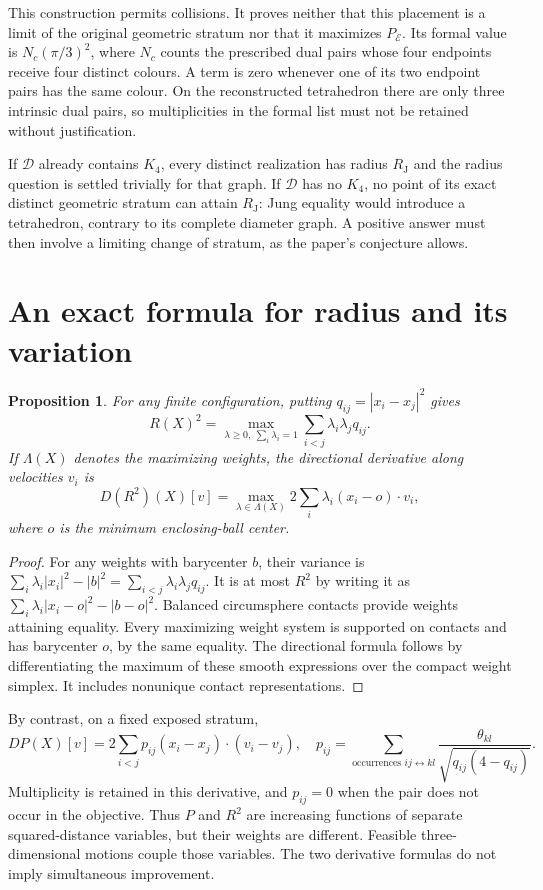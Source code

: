 \documentclass[11pt]{article}
\newtheorem{proposition}[theorem]{Proposition}
\theoremstyle{remark}\newtheorem{remark}[theorem]{Remark}
\newcommand{\RJ}{R_{\mathrm J}}
\begin{document}
This construction permits collisions. It proves neither that this
placement is a limit of the original geometric stratum nor that it
maximizes $P_{\mathcal E}$. Its formal value is
$N_c(\pi/3)^2$, where $N_c$ counts the prescribed dual pairs whose
four endpoints receive four distinct colours. A term is zero whenever
one of its two endpoint pairs has the same colour. On the reconstructed
tetrahedron there are only three intrinsic dual pairs, so multiplicities
in the formal list must not be retained without justification.

If $\mathcal D$ already contains $K_4$, every distinct realization has
radius $\RJ$ and the radius question is settled trivially for that graph.
If $\mathcal D$ has no $K_4$, no point of its exact distinct geometric
stratum can attain $\RJ$: Jung equality would introduce a tetrahedron,
contrary to its complete diameter graph. A positive answer must then
involve a limiting change of stratum, as the paper's conjecture allows.

\section{An exact formula for radius and its variation}
\begin{proposition}\label{fixed:dualradius}
For any finite configuration, putting $q_{ij}=|x_i-x_j|^2$ gives
\[
 \boxed{R(X)^2=\max_{\lambda\geq0,\ \sum_i\lambda_i=1}
                   \sum_{i<j}\lambda_i\lambda_j q_{ij}.}
\]
If $\Lambda(X)$ denotes the maximizing weights, the directional derivative
along velocities $v_i$ is
\[
 D(R^2)(X)[v]=\max_{\lambda\in\Lambda(X)}
 2\sum_i\lambda_i(x_i-o)\cdot v_i,
\]
where $o$ is the minimum enclosing-ball center.
\end{proposition}
\begin{proof}
For any weights with barycenter $b$, their variance is
$\sum_i\lambda_i|x_i|^2-|b|^2
=\sum_{i<j}\lambda_i\lambda_j q_{ij}$.
It is at most $R^2$ by writing it as
$\sum_i\lambda_i|x_i-o|^2-|b-o|^2$.
Balanced circumsphere contacts provide weights attaining equality.
Every maximizing weight system is supported on contacts and has
barycenter $o$, by the same equality. The directional formula follows
by differentiating the maximum of these smooth expressions over the
compact weight simplex. It includes nonunique contact representations.
\end{proof}

By contrast, on a fixed exposed stratum,
\[
 DP(X)[v]=2\sum_{i<j}p_{ij}(x_i-x_j)\cdot(v_i-v_j),
\quad
 p_{ij}=\sum_{\text{occurrences }ij\leftrightarrow kl}
 \frac{\theta_{kl}}{\sqrt{q_{ij}(4-q_{ij})}}.
\]
Multiplicity is retained in this derivative, and $p_{ij}=0$ when the
pair does not occur in the objective. Thus $P$ and $R^2$ are increasing
functions of separate squared-distance variables, but their weights
are different. Feasible three-dimensional motions couple those variables.
The two derivative formulas do not imply simultaneous improvement.
\end{document}
